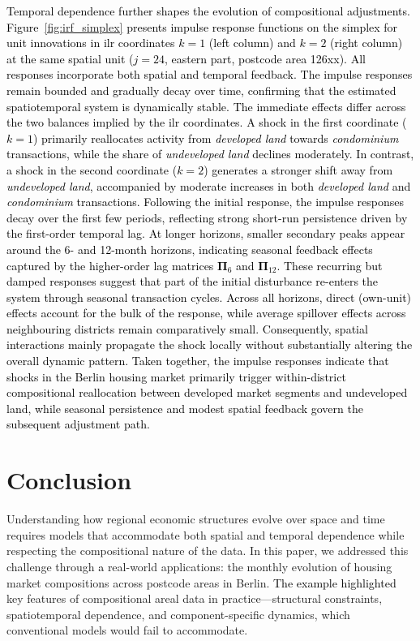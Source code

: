 \documentclass[12pt]{article}
\theoremstyle{plain}
\theoremstyle{definition}
\newcommand{\xmat}{\mathbf}
\begin{document}
\textcolor{black}{Temporal dependence further shapes the evolution of compositional adjustments. Figure~\ref{fig:irf_simplex} presents impulse response functions on the simplex for unit innovations in ilr coordinates $k=1$ (left column) and $k=2$ (right column) at the same spatial unit ($j=24$, eastern part, postcode area 126xx). All responses incorporate both spatial and temporal feedback. The impulse responses remain bounded and gradually decay over time, confirming that the estimated spatiotemporal system is dynamically stable. The immediate effects differ across the two balances implied by the ilr coordinates. A shock in the first coordinate ($k=1$) primarily reallocates activity from \emph{developed land} towards \emph{condominium} transactions, while the share of \emph{undeveloped land} declines moderately. In contrast, a shock in the second coordinate ($k=2$) generates a stronger shift away from \emph{undeveloped land}, accompanied by moderate increases in both \emph{developed land} and \emph{condominium} transactions.  Following the initial response, the impulse responses decay over the first few periods, reflecting strong short-run persistence driven by the first-order temporal lag. At longer horizons, smaller secondary peaks appear around the 6- and 12-month horizons, indicating seasonal feedback effects captured by the higher-order lag matrices $\xmat{\Pi}_{6}$ and $\xmat{\Pi}_{12}$. These recurring but damped responses suggest that part of the initial disturbance re-enters the system through seasonal transaction cycles. Across all horizons, direct (own-unit) effects account for the bulk of the response, while average spillover effects across neighbouring districts remain comparatively small. Consequently, spatial interactions mainly propagate the shock locally without substantially altering the overall dynamic pattern. Taken together, the impulse responses indicate that shocks in the Berlin housing market primarily trigger within-district compositional reallocation between developed market segments and undeveloped land, while seasonal persistence and modest spatial feedback govern the subsequent adjustment path.}




\section{Conclusion}\label{sec:conclusion}


Understanding how regional economic structures evolve over space and time requires models that accommodate both spatial and temporal dependence while respecting the compositional nature of the data. In this paper, we addressed this challenge through \textcolor{black}{a} real-world applications: the monthly evolution of housing market compositions across postcode areas in Berlin. \textcolor{black}{The example highlighted} key features of compositional areal data in practice---structural constraints, spatiotemporal dependence, and component-specific dynamics, which conventional models would fail to accommodate.
\end{document}
